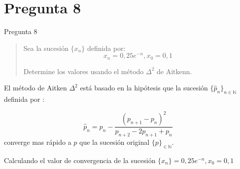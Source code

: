 \documentclass[10pt]{beamer}
\begin{document}


\section{Pregunta 8}





\vspace*{\fill}
\begin{frame}{Pregunta 8}

\begin{quote}

Sea la sucesión 
\begin{math}
\{x_n\}
\end{math}
definida por:
\[{x_n=0,25e^{-n},x_0=0,1}\] 

Determine los valores usando el método \(\Delta^2\) de Aitkenn.




\end{quote}


\end{frame}


\vspace*{\fill}
%


\vspace*{\fill}
El método de Aitken \(\Delta^2\) está basado en la hipótesis que la sucesión 
\(\{\widehat{p}_n\}_{n\in \mathbb N}\) definida por :

\begin{equation}
\widehat{p}_n = p_n - \dfrac{(p_{n+1}-p_{n})^2}{p_{n+2}-2p_{n+1}+p_n}
\end{equation}
converge mas rápido a \(p\) que la sucesión original \(\{p\}_{\in \mathbb N}\).

\vspace*{\fill}
%


\newpage
{}
\vspace*{\fill}

Calculando el valor de convergencia de la sucesión
\begin{math}
\{x_n\} = 0,25e^{-n} , x_{0}=0,1
\end{math}
\end{document}

